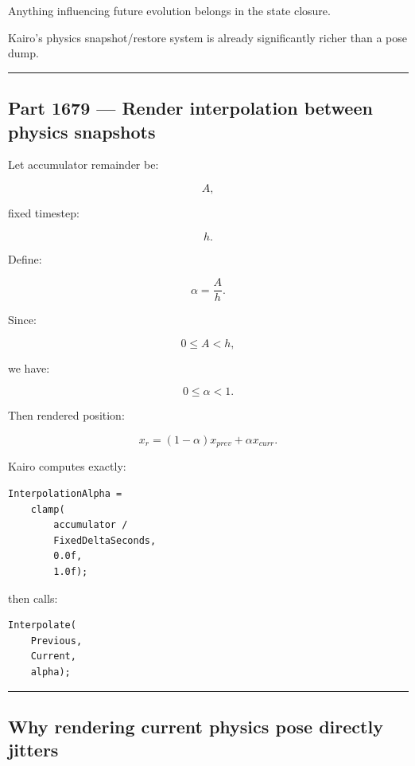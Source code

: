 Anything influencing future evolution belongs in the state closure.

Kairo's physics snapshot/restore system is already significantly richer than a pose dump.

\begin{center}\rule{0.5\linewidth}{0.5pt}\end{center}

\subsection{Part 1679 --- Render interpolation between physics snapshots}\label{06-engine-ii-ch037-part-1679-render-interpolation-between-physics-snapshots}

Let accumulator remainder be:

\[
A,
\]

fixed timestep:

\[
h.
\]

Define:

\[
\boxed{
\alpha
=
\frac{A}{h}.
}
\]

Since:

\[
0\le A<h,
\]

we have:

\[
0\le\alpha<1.
\]

Then rendered position:

\[
\boxed{
x_r
=
(1-\alpha)x_{prev}
+
\alpha x_{curr}.
}
\]

Kairo computes exactly:

\begin{verbatim}
InterpolationAlpha =
    clamp(
        accumulator /
        FixedDeltaSeconds,
        0.0f,
        1.0f);
\end{verbatim}

then calls:

\begin{verbatim}
Interpolate(
    Previous,
    Current,
    alpha);
\end{verbatim}

\begin{center}\rule{0.5\linewidth}{0.5pt}\end{center}

\subsection{Why rendering current physics pose directly jitters}\label{06-engine-ii-ch037-why-rendering-current-physics-pose-directly-jitters}

